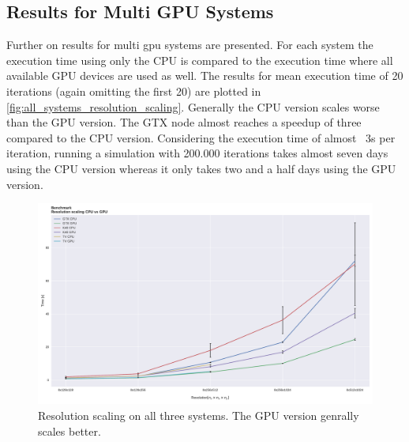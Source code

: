 \documentclass[master.tex]{subfiles}
\begin{document}
\subsection{Results for Multi GPU Systems}
Further on results for multi gpu systems are presented. For each system the execution time using only the CPU is compared to the execution time where all available GPU devices are used as well. The results for mean execution time of 20 iterations (again omitting the first 20) are plotted in \autoref{fig:all_systems_resolution_scaling}. Generally the CPU version scales worse than the GPU version. The GTX node almost reaches a speedup of three compared to the CPU version. Considering the execution time of almost ~3s per iteration, running a simulation with 200.000 iterations takes 
almost seven days using the CPU version whereas it only takes two and a half days using the GPU version. 
\begin{figure}[!hbtp]
    \centering
    \includegraphics[width=\linewidth]{pdfs/all_systems_compared.pdf}
    \caption{\small Resolution scaling on all three systems. The GPU version genrally scales better.}
    \label{fig:all_systems_resolution_scaling}
\end{figure}
\end{document}
